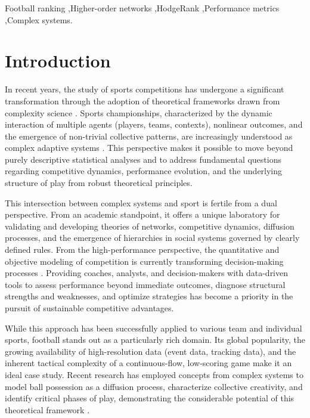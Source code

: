 \documentclass[preprint,12pt]{elsarticle}
\begin{document}
\begin{frontmatter}
\begin{keyword}
Football ranking \sep Higher-order networks \sep HodgeRank \sep Performance metrics \sep Complex systems.
\end{keyword}

\end{frontmatter}



\section{Introduction}

In recent years, the study of sports competitions has undergone a significant transformation through the adoption of theoretical frameworks drawn from complexity science
\cite{barthelemy2025fragility,Clauset2015safe,buldu2019defining,Ribeiro2012anomalous,Chacoma2022simple,Chacoma2023probabilistic,chacoma2025emergent,zappala2022role,ibanez2018relative,galeano2022using}. 
%
Sports championships, characterized by the dynamic interaction of multiple agents (players, teams, contexts), nonlinear outcomes, and the emergence of non-trivial collective patterns, are increasingly understood as complex adaptive systems \cite{silva2016sports}. This perspective makes it possible to move beyond purely descriptive statistical analyses and to address fundamental questions regarding competitive dynamics, performance evolution, and the underlying structure of play from robust theoretical principles.

This intersection between complex systems and sport is fertile from a dual perspective. From an academic standpoint, it offers a unique laboratory for validating and developing theories of networks, competitive dynamics, diffusion processes, and the emergence of hierarchies in social systems governed by clearly defined rules. From the high-performance perspective, the quantitative and objective modeling of competition is currently transforming decision-making processes \cite{ashford2021understanding}. Providing coaches, analysts, and decision-makers with data-driven tools to assess performance beyond immediate outcomes, diagnose structural strengths and weaknesses, and optimize strategies has become a priority in the pursuit of sustainable competitive advantages.

While this approach has been successfully applied to various team and individual sports, football stands out as a particularly rich domain. 
Its global popularity, the growing availability of high-resolution data (event data, tracking data), and the inherent tactical complexity of a continuous-flow, low-scoring game make it an ideal case study. Recent research has employed concepts from complex systems to model ball possession as a diffusion process, characterize collective creativity, and identify critical phases of play, demonstrating the considerable potential of this theoretical framework \cite{martinez2020spatial,cao2023football,yamamoto2024theory,chacoma2020modeling,chacoma2021stochastic,chacoma2025data,amichay2025characterizing}.
\end{document}

